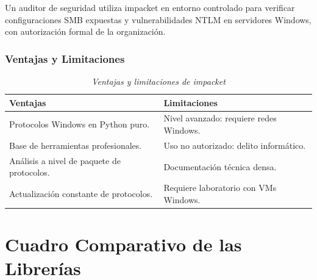 \documentclass[12pt,a4paper]{article}
\begin{document}
Un auditor de seguridad utiliza impacket en entorno controlado para
verificar configuraciones SMB expuestas y vulnerabilidades NTLM en
servidores Windows, con autorización formal de la organización.

\subsubsection{Ventajas y Limitaciones}

\begin{table}[H]
\centering
\begin{threeparttable}
\caption{\textit{Ventajas y limitaciones de impacket}}
\begin{tabular}{p{6.5cm}p{6.5cm}}
\toprule
\textbf{Ventajas} & \textbf{Limitaciones} \\
\midrule
Protocolos Windows en Python puro. & Nivel avanzado: requiere redes Windows. \\
Base de herramientas profesionales. & Uso no autorizado: delito informático. \\
Análisis a nivel de paquete de protocolos. & Documentación técnica densa. \\
Actualización constante de protocolos. & Requiere laboratorio con VMs Windows. \\
\bottomrule
\end{tabular}
\end{threeparttable}
\end{table}

\section{Cuadro Comparativo de las Librerías}
\end{document}
